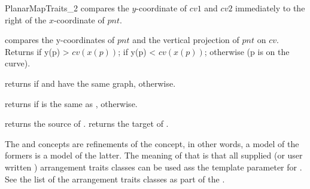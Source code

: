 \begin{ccRefConcept}{PlanarMapTraits_2}
    {compares the $y$-coordinate of $cv1$ and $cv2$ immediately to the right of
     the $x$-coordinate of $pnt$.
     }
    
    {compares the y-coordinates of $pnt$ and the vertical projection of $pnt$
      on $cv$. Returns  if y(p) > $cv(x(p))$; 
      if y(p) < $cv(x(p))$;  otherwise (p is on the curve).
    }

    {returns  if  and  have the same graph, 
       otherwise.}

    {returns  if  is the same as , 
      otherwise.}
	  

             {returns the source of .}
             {returns the target of .}


      

\ccHasModels

  The  and
   concepts are refinements of the
   concept, in other words, a model of the
  formers is a model of the latter.  The meaning of that is that all
  supplied (or user written ) arrangement traits classes can be used
  ass the  template parameter for
  .  See the list of the arrangement
  traits classes as part of the .
  
\end{ccRefConcept} %

\ccRefPageEnd















